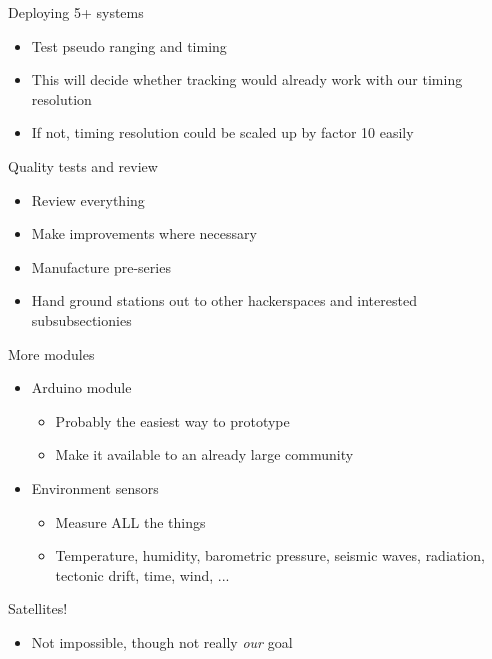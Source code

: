 	\begin{frame}{Deploying 5+ systems}
		\begin{itemize}
			\item Test pseudo ranging and timing
			\item This will decide whether tracking would already work with our timing resolution
			\item If not, timing resolution could be scaled up by factor 10 easily
		\end{itemize}
	\end{frame}
	\begin{frame}{Quality tests and review}
		\begin{itemize}
			\item Review everything
			\item Make improvements where necessary
			\item Manufacture pre-series
			\item Hand ground stations out to other hackerspaces and interested subsubsectionies
		\end{itemize}
	\end{frame}
	\begin{frame}{More modules}
		\begin{itemize}
			\item Arduino module
			\begin{itemize}
				\item Probably the easiest way to prototype
				\item Make it available to an already large community
			\end{itemize}
			\item Environment sensors
			\begin{itemize}
				\item Measure ALL the things
				\item Temperature, humidity, barometric pressure, seismic waves, radiation, tectonic drift, time, wind, ...
			\end{itemize}
		\end{itemize}
	\end{frame}
	\begin{frame}{Satellites!}
		\begin{itemize}
			\item Not impossible, though not really \emph{our} goal
		\end{itemize}
	\end{frame}

